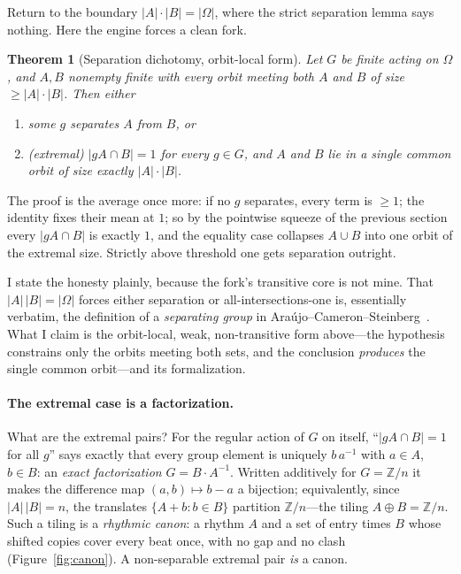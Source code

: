 \documentclass[11pt]{article}
\newtheorem{theorem}{Theorem}
\newcommand{\Z}{\mathbb{Z}}
\begin{document}
Return to the boundary $|A|\cdot|B|=|\Omega|$, where the strict separation lemma
says nothing. Here the engine forces a clean fork.

\begin{theorem}[Separation dichotomy, orbit-local form]
Let $G$ be finite acting on $\Omega$, and $A,B$ nonempty finite with every orbit
meeting both $A$ and $B$ of size $\ge|A|\cdot|B|$. Then either
\begin{enumerate}
\item[\rm(1)] some $g$ separates $A$ from $B$, or
\item[\rm(2)] \emph{(extremal)} $|gA\cap B|=1$ for \emph{every} $g\in G$, and $A$
  and $B$ lie in a single common orbit of size exactly $|A|\cdot|B|$.
\end{enumerate}
\end{theorem}

The proof is the average once more: if no $g$ separates, every term is $\ge1$; the
identity fixes their mean at $1$; so by the pointwise squeeze of the previous
section every $|gA\cap B|$ is exactly $1$, and the equality case collapses
$A\cup B$ into one orbit of the extremal size. Strictly above threshold one gets
separation outright.

I state the honesty plainly, because the fork's transitive core is not mine. That
$|A|\,|B|=|\Omega|$ forces either separation or all-intersections-one is,
essentially verbatim, the definition of a \emph{separating group} in
Araújo--Cameron--Steinberg~\cite{ACS2017}. What I claim is the orbit-local, weak,
non-transitive form above---the hypothesis constrains only the orbits meeting both
sets, and the conclusion \emph{produces} the single common orbit---and its
formalization.

\paragraph{The extremal case is a factorization.} What are the extremal pairs?
For the regular action of $G$ on itself, ``$|gA\cap B|=1$ for all $g$'' says
exactly that every group element is uniquely $b\,a^{-1}$ with $a\in A$, $b\in B$:
an \emph{exact factorization} $G=B\cdot A^{-1}$. Written additively for $G=\Z/n$ it
makes the difference map $(a,b)\mapsto b-a$ a bijection; equivalently, since
$|A|\,|B|=n$, the translates $\{A+b : b\in B\}$ partition $\Z/n$---the tiling
$A\oplus B=\Z/n$. Such a tiling is a \emph{rhythmic canon}: a rhythm $A$ and a set
of entry times $B$ whose shifted copies cover every beat once, with no gap and no
clash (Figure~\ref{fig:canon}). A non-separable extremal pair \emph{is} a canon.
\end{document}
